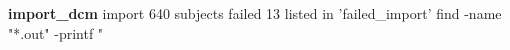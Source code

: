 \documentclass{article}
\begin{document}
\textbf{import_dcm}
import 640 subjects
failed 13 listed in 'failed_import'
find -name "*.out" -printf "%
\end{document}
